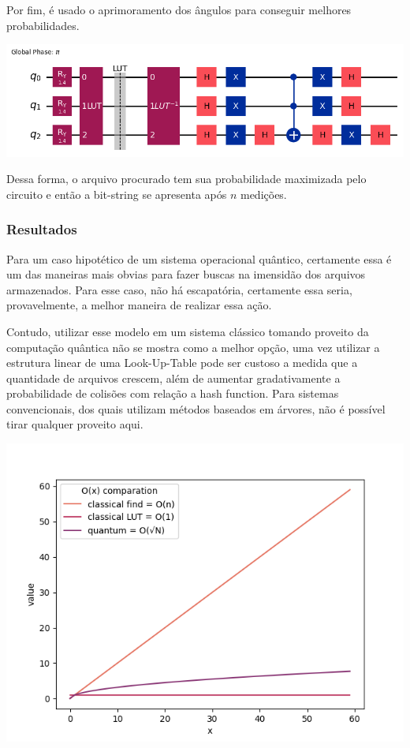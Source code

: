 \documentclass{article}
\begin{document}
Por fim, é usado o aprimoramento dos ângulos para conseguir melhores probabilidades.

\begin{center}
	\includegraphics[scale=0.6]{improved_file_explorer.png}
	\label{fig:file-explorer}
\end{center}

Dessa forma, o arquivo procurado tem sua probabilidade maximizada pelo circuito e então a bit-string se apresenta após $n$ medições.



\subsubsection{Resultados}

Para um caso hipotético de um sistema operacional quântico, certamente essa é um das maneiras mais obvias para fazer buscas na imensidão dos arquivos armazenados. Para esse caso, não há escapatória, certamente essa seria, provavelmente, a melhor maneira de realizar essa ação.

Contudo, utilizar esse modelo em um sistema clássico tomando proveito da computação quântica não se mostra como a melhor opção, uma vez utilizar a estrutura linear de uma Look-Up-Table pode ser custoso a medida que a quantidade de arquivos crescem, além de aumentar gradativamente a probabilidade de colisões com relação a hash function. Para sistemas convencionais, dos quais utilizam métodos baseados em árvores, não é possível tirar qualquer proveito aqui.

\begin{center}
	\includegraphics[scale=0.5]{algorithms-finding-comparation.png}
	\label{fig:file-explorer-comparation-O}
\end{center}
\end{document}

